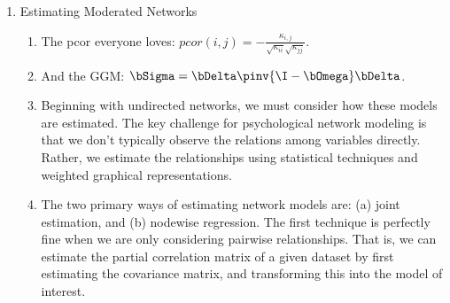 \begin{enumerate}
    \begin{enumerate}
        \item What is moderation? And what are interaction terms?
        \item Regression framework for testing interactions
        \item The real purpose here is to test conditional hypotheses, including hypotheses about group differences in network structures. 
        \item Criticisms of moderated regression models are often misguided. These models can be powerful when used and interpreted properly. Importantly, we must remember that we are testing conditional effects, and therefore should consider the marginal effects of a given variable with respect to how these might change in accordance with a moderator variable.
        \item Some important considerations are: (a) thinking about the interpretation of the `moderator'. Does theory allow us to rule out the possibility that $M$ has a causal effect on $Y$? Or is the analysis too exploratory to be sure? (b) even if we do identify a moderator, are we interpreting effects that have sufficient support from our sample? That is, what is the observed distribution of the moderator, and how does this relate to the effects that we report? (c) how replicable can we expect our effects to be? Are there other variables that would be important to consider for the context at hand?
        \item In the next section, I will describe how to estimate, analyze, and interpret moderated network models using this framework.
    \end{enumerate}
    \item Estimating Moderated Networks
    \begin{enumerate}
        \item The pcor everyone loves: $pcor(i,j) = -\frac{\kappa_{i,j}}{\sqrt{\kappa_{ii}}\sqrt{\kappa_{jj}}}$. 
        \item And the GGM: $\bSigma = \bDelta\pinv{\I - \bOmega}\bDelta$.
        \item Beginning with undirected networks, we must consider how these models are estimated. The key challenge for psychological network modeling is that we don't typically observe the relations among variables directly. Rather, we estimate the relationships using statistical techniques and weighted graphical representations. 
        \item The two primary ways of estimating network models are: (a) joint estimation, and (b) nodewise regression. The first technique is perfectly fine when we are only considering pairwise relationships. That is, we can estimate the partial correlation matrix of a given dataset by first estimating the covariance matrix, and transforming this into the model of interest. 

\end{enumerate}
\end{enumerate}
